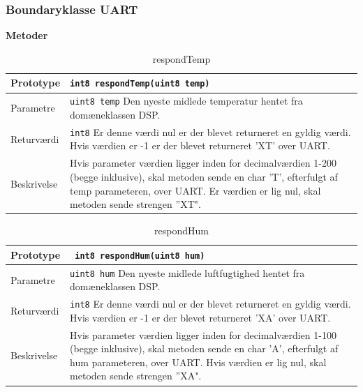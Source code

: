 
\newpage

\subsubsection{Boundaryklasse UART}
\textbf{Metoder}


\begin{table}[h]
\begin{tabularx}{\textwidth}{| >{\raggedright\arraybackslash}p{2.5 cm} | >{\raggedright\arraybackslash}X |} \hline
Prototype & \texttt{int8 respondTemp(uint8 temp)} \\\hline
Parametre & \texttt{uint8 temp} \newline
Den nyeste midlede temperatur hentet fra domæneklassen DSP. 
 \\\hline
Returværdi & \texttt{int8} \newline
Er denne værdi nul er der blevet returneret en gyldig værdi. Hvis værdien er -1 er der blevet returneret ’XT’ over UART. \\\hline
Beskrivelse & Hvis parameter værdien ligger inden for decimalværdien 1-200 (begge inklusive), skal metoden sende en char ’T’, efterfulgt af temp parameteren, over UART. Er værdien er lig nul, skal metoden sende strengen ”XT".   \\\hline
\end{tabularx}
\caption{respondTemp}
\label{table:respondTemp}
\end{table}


\begin{table}[h]
\begin{tabularx}{\textwidth}{| >{\raggedright\arraybackslash}p{2.5 cm} | >{\raggedright\arraybackslash}X |} \hline
Prototype & \texttt{ int8 respondHum(uint8 hum)} \\\hline
Parametre & \texttt{uint8 hum} \newline
Den nyeste midlede luftfugtighed hentet fra domæneklassen DSP. 
 \\\hline
Returværdi & \texttt{int8} \newline
Er denne værdi nul er der blevet returneret en gyldig værdi. Hvis værdien er -1 er der blevet returneret ’XA’ over UART. \\\hline
Beskrivelse & Hvis parameter værdien ligger inden for decimalværdien 1-100 (begge inklusive), skal metoden sende en char ’A’, efterfulgt af hum parameteren, over UART. Hvis værdien er lig nul, skal metoden sende strengen ”XA".    \\\hline
\end{tabularx}
\caption{respondHum}
\label{table:respondHum}
\end{table}

